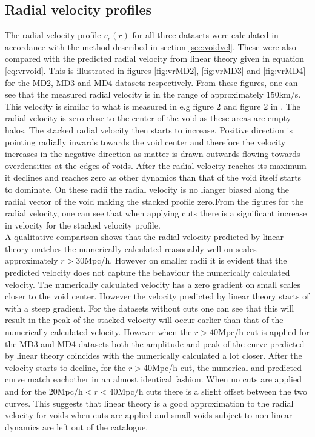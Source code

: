 \subsection{Radial velocity profiles}
The radial velocity profile $v_r(r)$ for all three datasets were calculated in accordance with the method described in section \ref{sec:voidvel}. These were also compared with the predicted radial velocity from linear theory given in equation \ref{eq:vrvoid}. This is illustrated in figures \ref{fig:vrMD2}, \ref{fig:vrMD3} and \ref{fig:vrMD4} for the MD2, MD3 and MD4 datasets respectively. From these figures, one can see that the measured radial velocity is in the range of approximately $150$km/s. This velocity is similar to what is measured in \cite{Nadathur_2018} e.g figure 2 and figure 2 in \cite{Achitouv_streaming}. The radial velocity is zero close to the center of the void as these areas are empty halos. The stacked radial velocity then starts to increase. Positive direction is pointing radially inwards towards the void center and therefore the velocity increases in the negative direction as matter is drawn outwards flowing towards overdensities at the edges of voids. After the radial velocity reaches its maximum it declines and reaches zero as other dynamics than that of the void itself starts to dominate. On these radii the radial velocity is no lianger biased along the radial vector of the void making the stacked profile zero.From the figures for the radial velocity, one can see that when applying cuts there is a significant increase in velocity for the stacked velocity profile. \\\indent
A qualitative comparison shows that the radial velocity predicted by linear theory matches the numerically calculated reasonably well on scales approximately $r>30$Mpc/h. However on smaller radii it is evident that the predicted velocity does not capture the behaviour the numerically calculated velocity. The numerically calculated velocity has a zero gradient on small scales closer to the void center. However the velocity predicted by linear theory starts of with a steep gradient. For the datasets without cuts one can see that this will result in the peak of the stacked velocity will occur earlier than that of the numerically calculated velocity. However when the $r>40$Mpc/h cut is applied for the MD3 and MD4 datasets both the amplitude and peak of the curve predicted by linear theory coincides with the numerically calculated a lot closer. After the velocity starts to decline, for the $r>40$Mpc/h cut, the numerical and predicted curve match eachother in an almost identical fashion. When no cuts are applied and for the $20$Mpc/h$<r<40$Mpc/h cuts there is a slight offset between the two curves. This suggests that linear theory is a good approximation to the radial velocity for voids when cuts are applied and small voids subject to non-linear dynamics are left out of the catalogue.\\\indent
